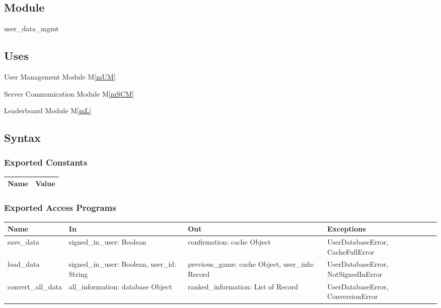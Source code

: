 \documentclass[12pt, titlepage]{article}
\newcommand{\mref}[1]{M\ref{#1}}
\begin{document}
\subsection{Module}

user\_data\_mgmt 

\subsection{Uses}

User Management Module \mref{mUM}

Server Communication Module \mref{mSCM}

Leaderboard Module \mref{mL}

\subsection{Syntax}

\subsubsection{Exported Constants}

\begin{center}
\begin{tabular}{p{10cm} p{4cm}}
\hline
\textbf{Name} & \textbf{Value}\\
\hline

\hline
\end{tabular}
\end{center}

\subsubsection{Exported Access Programs}

\begin{center}
\begin{tabular}{p{4cm} p{4cm} p{4cm} p{4cm}}
\hline
\textbf{Name} & \textbf{In} & \textbf{Out} & \textbf{Exceptions} \\
\hline
save\_data & signed\_in\_user: Boolean  & confirmation: cache Object & UserDatabaseError, CacheFullError \\
load\_data & signed\_in\_user: Boolean, user\_id: String  & previous\_game: cache Object, user\_info: Record & UserDatabaseError, NotSignedInError \\
convert\_all\_data & all\_information: database Object & ranked\_information: List of Record & UserDatabaseError, ConversionError \\
\hline
\end{tabular}
\end{center}
\end{document}

